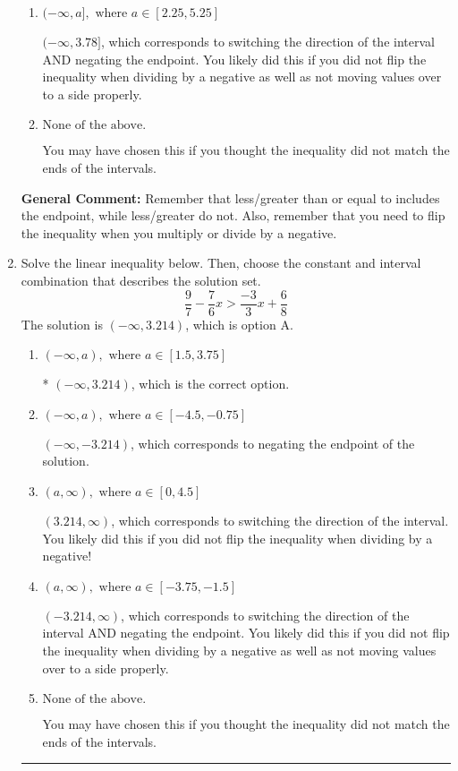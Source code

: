 \documentclass{extbook}[14pt]
\newcommand{\litem}[1]{\item #1

\rule{\textwidth}{0.4pt}}
\begin{document}
\begin{enumerate}
{\begin{enumerate}[label=\Alph*.]
 $[3.78, \infty)$, which corresponds to negating the endpoint of the solution.
\item \( (-\infty, a], \text{ where } a \in [2.25, 5.25] \)

 $(-\infty, 3.78]$, which corresponds to switching the direction of the interval AND negating the endpoint. You likely did this if you did not flip the inequality when dividing by a negative as well as not moving values over to a side properly.
\item \( \text{None of the above}. \)

You may have chosen this if you thought the inequality did not match the ends of the intervals.
\end{enumerate}

\textbf{General Comment:} Remember that less/greater than or equal to includes the endpoint, while less/greater do not. Also, remember that you need to flip the inequality when you multiply or divide by a negative.
}
\litem{
Solve the linear inequality below. Then, choose the constant and interval combination that describes the solution set.
\[ \frac{9}{7} - \frac{7}{6} x > \frac{-3}{3} x + \frac{6}{8} \]The solution is \( (-\infty, 3.214) \), which is option A.\begin{enumerate}[label=\Alph*.]
\item \( (-\infty, a), \text{ where } a \in [1.5, 3.75] \)

* $(-\infty, 3.214)$, which is the correct option.
\item \( (-\infty, a), \text{ where } a \in [-4.5, -0.75] \)

 $(-\infty, -3.214)$, which corresponds to negating the endpoint of the solution.
\item \( (a, \infty), \text{ where } a \in [0, 4.5] \)

 $(3.214, \infty)$, which corresponds to switching the direction of the interval. You likely did this if you did not flip the inequality when dividing by a negative!
\item \( (a, \infty), \text{ where } a \in [-3.75, -1.5] \)

 $(-3.214, \infty)$, which corresponds to switching the direction of the interval AND negating the endpoint. You likely did this if you did not flip the inequality when dividing by a negative as well as not moving values over to a side properly.
\item \( \text{None of the above}. \)

You may have chosen this if you thought the inequality did not match the ends of the intervals.
\end{enumerate}

}
\end{enumerate}
\end{document}
